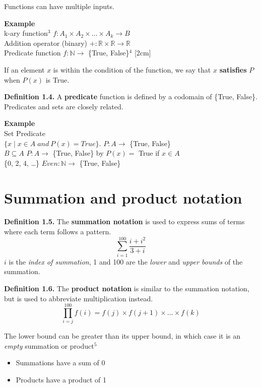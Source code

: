 \documentclass{article}
\begin{document}
Functions can have multiple inputs.

\textbf{Example} \\
k-ary function$^3$ \hfill $f : A_1 \times A_2 \times \ldots \times A_k \to B$ \\
Addition operator (binary) \hfill $ + : \mathbb{R} \times \mathbb{R} \to \mathbb{R} $ \\
Predicate function \hfill $ f : \mathbb{N} \to $ \{True, False\}$^4$
[2cm]

If an element $x$ is within the condition of the function, we say that $x$
\textbf{satisfies} $P$ when $P(x)$ is True.

\textbf{Definition 1.4.} A \textbf{predicate} function is defined by a codomain
of \{True, False\}. Predicates and sets are closely related.

\textbf{Example} \\
Set \hfill Predicate \\
$\{ x \mid x \in A \; and \:P(x) = True\}$. \hfill $ P : A \to$ \{True, False\} \\
$B \subseteq A$ \hfill $P : A \to $ \{True, False\} by $P(x) = $ True if $x \in A$ \\
\{0, 2, 4, \ldots \} \hfill  $ Even : \mathbb{N} \to $ \{True, False\}

\section{Summation and product notation}
\textbf{Definition 1.5.} The \textbf{summation notation} is used to express
sums of terms where each term follows a pattern.
$$ \sum_{i=1}^{100} \frac{i + i^2}{3 + i} $$
$i$ is the \emph{index of summation}, 1 and 100 are the \emph{lower} and 
\emph{upper bounds} of the summation.

\textbf{Definition 1.6.} The \textbf{product notation} is similar to the 
summation notation, but is used to abbreviate multiplication instead.
$$ \prod_{i=j}^{100} f(i) = f(j) \times f(j+1) \times \ldots \times f(k) $$

The lower bound can be greater than its upper bound, in which case it
is an \emph{empty} summation or product$^5$ 
\begin{itemize}
    \item Summations have a sum of 0
    \item Products have a product of 1
\end{itemize}
\end{document}
